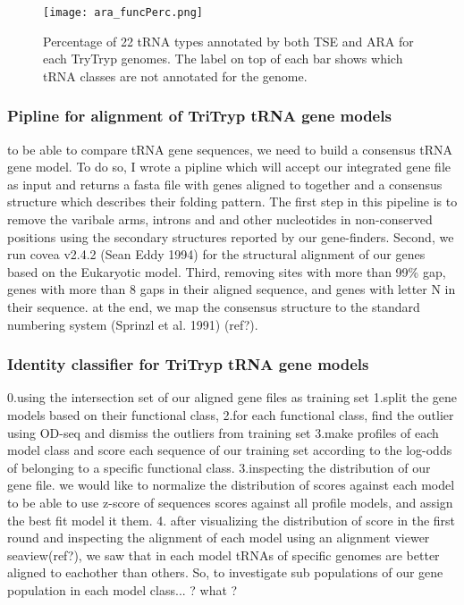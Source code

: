 \documentclass[
10pt, %
a4paper, %
oneside, %
headinclude,footinclude, %
BCOR5mm, %
]{scrartcl}
\begin{document}
\begin{figure}[tb]
\centering 
\texttt{[image: ara\_funcPerc.png]} 
\caption[Genome Comparison]{Percentage of 22 tRNA types annotated by both TSE and ARA for each TryTryp genomes. The label on top of each bar shows which tRNA classes are not annotated for the genome.} %
\label{fig:types} 
\end{figure}

\subsubsection*{Pipline for alignment of TriTryp tRNA gene models}
to be able to compare tRNA gene sequences, we need to build a consensus tRNA gene model. To do so, I wrote a pipline which will accept our integrated gene file as input and returns a fasta file with genes aligned to together and a consensus structure which describes their folding pattern. The first step in this pipeline is to remove the varibale arms, introns and and other nucleotides in non-conserved positions using the secondary structures reported by our gene-finders. Second, we run covea v2.4.2 (Sean Eddy 1994) for the structural alignment of our genes based on the Eukaryotic model. Third, removing sites with more than 99\% gap, genes with more than 8 gaps in their aligned sequence, and genes with letter N in their sequence. at the end, we map the consensus structure to the standard numbering system (Sprinzl et al. 1991) (ref?).

\subsubsection*{Identity classifier for TriTryp tRNA gene models}
0.using the intersection set of our aligned gene files as training set
1.split the gene models based on their functional class, 
2.for each functional class, find the outlier using OD-seq and dismiss the outliers from training set
3.make profiles of each model class and score each sequence of our training set according to the log-odds of belonging to a specific functional class.
3.inspecting the distribution of our gene file. we would like to normalize the distribution of scores against each model to be able to use z-score of sequences scores against all profile models, and assign the best fit model it them.
4. after visualizing the distribution of score in the first round and inspecting the alignment of each model using an alignment viewer seaview(ref?), we saw that in each model tRNAs of specific genomes are better aligned to eachother than others. So, to investigate sub populations of our gene population in each model class... ? what ? 
\end{document}
